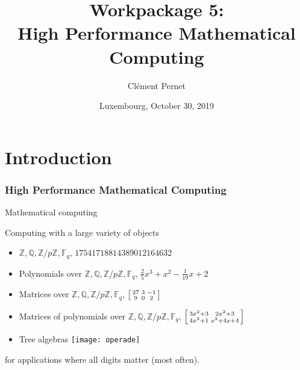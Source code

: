 \documentclass{beamer}
\title[WP 5]{Workpackage 5:\\ High Performance Mathematical Computing}
\author[C. Pernet]{Clément Pernet}
\date[Luxembourg, 2019-10-30]{Luxembourg, October 30, 2019}
\institute[ODK Final project review]{Final OpenDreamKit Project review}
\newenvironment{smatrix}{\left[\begin{smallmatrix}}{\end{smallmatrix}\right]}
\newcommand{\Z}{\ensuremath{\mathbb{Z}\xspace}}
\newcommand{\Q}{\ensuremath{\mathbb{Q}\xspace}}
\newcommand{\F}{\ensuremath{\mathbb{F}\xspace}}
\begin{document}
\maketitle

\section*{Introduction}
\begin{frame}
  \frametitle{High Performance Mathematical Computing}
  \begin{block}{Mathematical computing}

    Computing with a large variety of objects
        \begin{itemize}%
        \item $\Z, \Q, \Z/p\Z, \F_q$, \hfill {\color{blue} $17541718814389012164632$}
        \item Polynomials over $\Z, \Q, \Z/p\Z, \F_q$, \hfill {\color{blue} $\frac{2}{5} x^{3} + x^{2} - \frac{1}{19} x + 2$}
        \item Matrices over $\Z, \Q, \Z/p\Z, \F_q$, \hfill
           {\color{blue} $\begin{smatrix} 27&3&-1\\ 9&0& 2 \end{smatrix} $}
        \item Matrices of polynomials over $\Z, \Q, \Z/p\Z, \F_q$, \hfill
          {\color{blue} $ \begin{smatrix}
            3 x^{2} + 3 & 2 x^{2} + 3 \\4 x^{2} + 1 & x^{2} + 4 x + 4
          \end{smatrix}$}
        \item Tree algebras \hfill
      \texttt{[image: operade]}
        \end{itemize}

        for applications where \alert{all} digits matter (most often).

  \end{block}
\end{frame}
\end{document}
